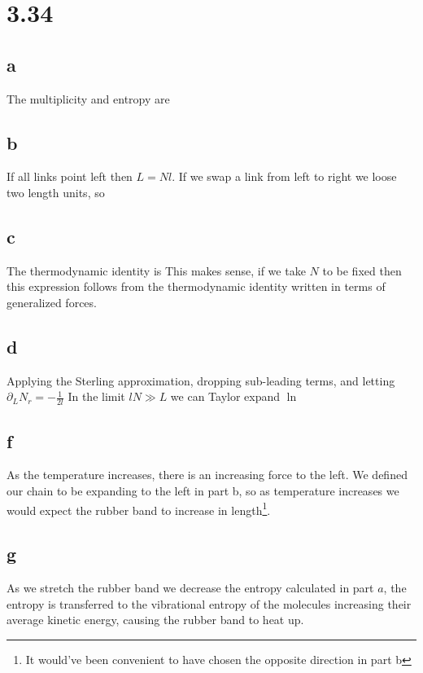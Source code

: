 \section*{3.34}
\subsection*{a}
The multiplicity and entropy are
\subsection*{b}
If all links point left then $L=Nl$. If we swap a link from left to right we loose two length units, so
\subsection*{c}
The thermodynamic identity is
This makes sense, if we take $N$ to be fixed then this expression follows from the thermodynamic identity written in terms of generalized forces.
\subsection*{d}
Applying the Sterling approximation, dropping sub-leading terms, and letting $\partial_L N_r = -\frac{1}{2l}$
In the limit $lN \gg L$ we can Taylor expand $\ln$
\subsection*{f}
As the temperature increases, there is an increasing force to the left. We defined our chain to be expanding to the left in part b, so as temperature increases we would expect the rubber band to increase in length\footnote{It would've been convenient to have chosen the opposite direction in part b}.
\subsection*{g}
As we stretch the rubber band we decrease the entropy calculated in part $a$, the entropy is transferred to the vibrational entropy of the molecules increasing their average kinetic energy, causing the rubber band to heat up.
